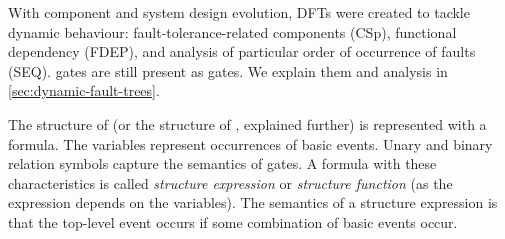 \documentclass[12pt,openright,twoside,a4paper,oldfontcommands,english,brazil,draft]{abntex2}
\theoremstyle{theo}
\begin{document}
\begin{sloppypar}
With component and system design evolution, \acp{DFT} were created to tackle dynamic behaviour: fault-tolerance-related components (\ac{CSp}), functional dependency (\ac{FDEP}), and analysis of particular order of occurrence of faults (\ac{SEQ}).
 gates are still present as  gates.
We explain them and  analysis in \cref{sec:dynamic-fault-trees}.
\end{sloppypar}

The structure of  (or the structure of , explained further) is represented with a formula.
The variables represent occurrences of basic events.
Unary and binary relation symbols capture the semantics of gates.
A formula with these characteristics is called \emph{structure expression} or \emph{structure function} (as the expression depends on the variables).
The semantics of a structure expression is that the top-level event occurs if some combination of basic events occur.
\end{document}
